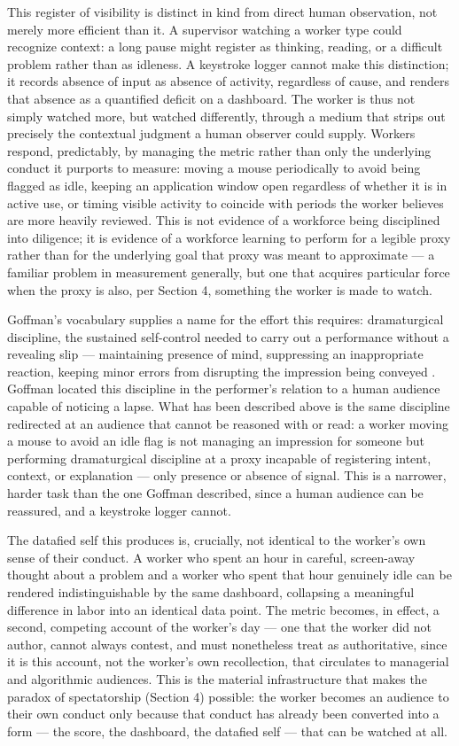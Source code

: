 \documentclass[10pt]{article}
\begin{document}
This register of visibility is distinct in kind from direct human observation, not merely more efficient than it. A supervisor watching a worker type could recognize context: a long pause might register as thinking, reading, or a difficult problem rather than as idleness. A keystroke logger cannot make this distinction; it records absence of input as absence of activity, regardless of cause, and renders that absence as a quantified deficit on a dashboard. The worker is thus not simply watched more, but watched differently, through a medium that strips out precisely the contextual judgment a human observer could supply. Workers respond, predictably, by managing the metric rather than only the underlying conduct it purports to measure: moving a mouse periodically to avoid being flagged as idle, keeping an application window open regardless of whether it is in active use, or timing visible activity to coincide with periods the worker believes are more heavily reviewed. This is not evidence of a workforce being disciplined into diligence; it is evidence of a workforce learning to perform for a legible proxy rather than for the underlying goal that proxy was meant to approximate --- a familiar problem in measurement generally, but one that acquires particular force when the proxy is also, per Section 4, something the worker is made to watch.

Goffman's vocabulary supplies a name for the effort this requires: dramaturgical discipline, the sustained self-control needed to carry out a performance without a revealing slip --- maintaining presence of mind, suppressing an inappropriate reaction, keeping minor errors from disrupting the impression being conveyed \cite{goffman}. Goffman located this discipline in the performer's relation to a human audience capable of noticing a lapse. What has been described above is the same discipline redirected at an audience that cannot be reasoned with or read: a worker moving a mouse to avoid an idle flag is not managing an impression for someone but performing dramaturgical discipline at a proxy incapable of registering intent, context, or explanation --- only presence or absence of signal. This is a narrower, harder task than the one Goffman described, since a human audience can be reassured, and a keystroke logger cannot.

The datafied self this produces is, crucially, not identical to the worker's own sense of their conduct. A worker who spent an hour in careful, screen-away thought about a problem and a worker who spent that hour genuinely idle can be rendered indistinguishable by the same dashboard, collapsing a meaningful difference in labor into an identical data point. The metric becomes, in effect, a second, competing account of the worker's day --- one that the worker did not author, cannot always contest, and must nonetheless treat as authoritative, since it is this account, not the worker's own recollection, that circulates to managerial and algorithmic audiences. This is the material infrastructure that makes the paradox of spectatorship (Section 4) possible: the worker becomes an audience to their own conduct only because that conduct has already been converted into a form --- the score, the dashboard, the datafied self --- that can be watched at all.
\end{document}
